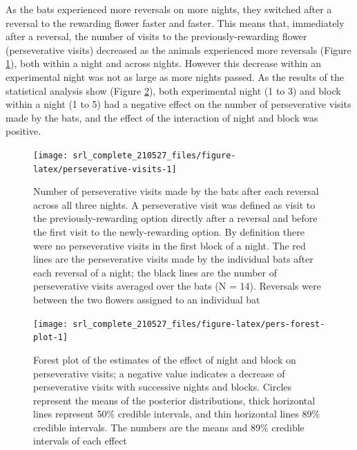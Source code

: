 \documentclass[
]{article}
\begin{document}
As the bats experienced more reversals on more nights, they switched after a reversal to the rewarding flower faster and faster. This means that, immediately after a reversal, the number of visits to the previously-rewarding flower (perseverative visits) decreased as the animals experienced more reversals (Figure \ref{fig:perseverative-visits}), both within a night and across nights. However this decrease within an experimental night was not as large as more nights passed. As the results of the statistical analysis show (Figure \ref{fig:pers-forest-plot}), both experimental night (1 to 3) and block within a night (1 to 5) had a negative effect on the number of perseverative visits made by the bats, and the effect of the interaction of night and block was positive.



\begin{figure}[H]

{\centering \texttt{[image: srl\_complete\_210527\_files/figure-latex/perseverative-visits-1]} 

}

\caption{Number of perseverative visits made by the bats after each reversal across all three nights. A perseverative visit was defined as visit to the previously-rewarding option directly after a reversal and before the first visit to the newly-rewarding option. By definition there were no perseverative visits in the first block of a night. The red lines are the perseverative visits made by the individual bats after each reversal of a night; the black lines are the number of perseverative visits averaged over the bats (N = 14). Reversals were between the two flowers assigned to an individual bat}\label{fig:perseverative-visits}
\end{figure}



\begin{figure}[H]

{\centering \texttt{[image: srl\_complete\_210527\_files/figure-latex/pers-forest-plot-1]} 

}

\caption{Forest plot of the estimates of the effect of night and block on perseverative visits; a negative value indicates a decrease of perseverative visits with successive nights and blocks. Circles represent the means of the posterior distributions, thick horizontal lines represent 50\% credible intervals, and thin horizontal lines 89\% credible intervals. The numbers are the means and 89\% credible intervals of each effect}\label{fig:pers-forest-plot}
\end{figure}
\end{document}
